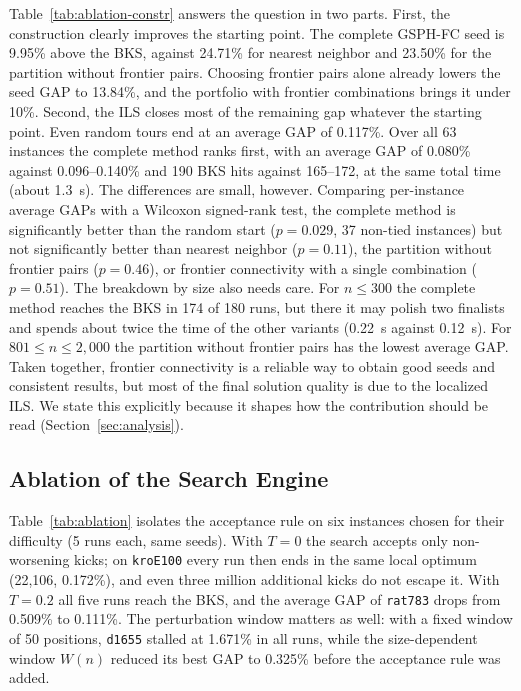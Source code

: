 \documentclass[runningheads]{llncs}
\begin{document}
Table~\ref{tab:ablation-constr} answers the question in two parts.
First, the construction clearly improves the starting point. The
complete GSPH-FC seed is 9.95\% above the BKS, against 24.71\% for
nearest neighbor and 23.50\% for the partition without frontier pairs.
Choosing frontier pairs alone already lowers the seed GAP to 13.84\%,
and the portfolio with frontier combinations brings it under 10\%.
Second, the ILS closes most of the remaining gap whatever the starting
point. Even random tours end at an average GAP of 0.117\%. Over all 63
instances the complete method ranks first, with an average GAP of
0.080\% against 0.096--0.140\% and 190 BKS hits against 165--172, at the
same total time (about 1.3~s). The differences are small, however.
Comparing per-instance average GAPs with a Wilcoxon signed-rank test,
the complete method is significantly better than the random start
($p=0.029$, 37 non-tied instances) but not significantly better than
nearest neighbor ($p=0.11$), the partition without frontier pairs
($p=0.46$), or frontier connectivity with a single combination
($p=0.51$). The breakdown by size also needs care. For $n\le 300$ the
complete method reaches the BKS in 174 of 180 runs, but there it may
polish two finalists and spends about twice the time of the other
variants (0.22~s against 0.12~s). For $801\le n\le 2{,}000$ the
partition without frontier pairs has the lowest average GAP. Taken
together, frontier connectivity is a reliable way to obtain good seeds
and consistent results, but most of the final solution quality is due
to the localized ILS. We state this explicitly because it shapes how the
contribution should be read (Section~\ref{sec:analysis}).

\subsection{Ablation of the Search Engine}

Table~\ref{tab:ablation} isolates the acceptance rule on six instances
chosen for their difficulty (5 runs each, same seeds). With $T=0$ the
search accepts only non-worsening kicks; on \texttt{kroE100} every run
then ends in the same local optimum (22{,}106, 0.172\%), and even three
million additional kicks do not escape it. With $T=0.2$ all five runs
reach the BKS, and the average GAP of \texttt{rat783} drops from
0.509\% to 0.111\%. The perturbation window matters as well: with a
fixed window of 50 positions, \texttt{d1655} stalled at 1.671\% in all
runs, while the size-dependent window $W(n)$ reduced its best GAP to
0.325\% before the acceptance rule was added.
\end{document}

